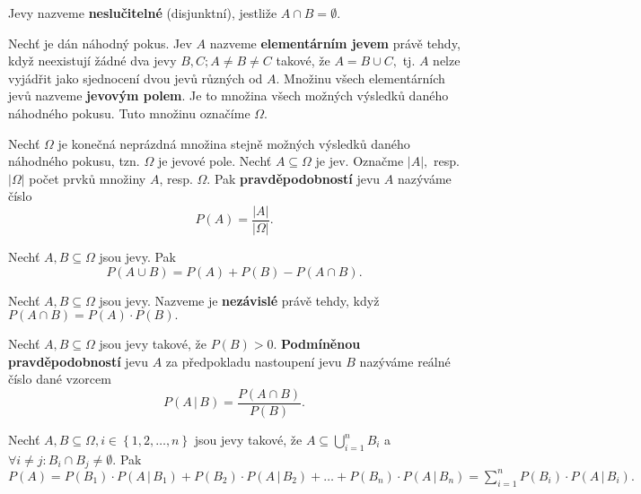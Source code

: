 \begin{definition}
    Jevy nazveme \textbf{neslučitelné} (disjunktní), jestliže $A\cap B = \emptyset.$
\end{definition}

\begin{definition}
    Nechť je dán náhodný pokus. Jev $A$ nazveme \textbf{elementárním jevem} právě tehdy,
    když neexistují žádné dva jevy $B,C; A\ne B\ne C$ takové, že $A=B\cup C,$ tj.
    $A$ nelze vyjádřit jako sjednocení dvou jevů různých od $A.$ Množinu všech
    elementárních jevů nazveme \textbf{jevovým polem}. Je to množina všech možných
    výsledků daného náhodného pokusu. Tuto množinu označíme $\Omega.$
\end{definition}

\begin{definition}
    Nechť $\Omega$ je konečná neprázdná množina stejně možných výsledků daného
    náhodného pokusu, tzn. $\Omega$ je jevové pole. Nechť $A\subseteq \Omega$ je jev.
    Označme $|A|,$ resp. $|\Omega|$ počet prvků množiny $A$, resp. $\Omega.$ Pak
    \textbf{pravděpodobností} jevu $A$ nazýváme číslo
    $$P(A)=\frac{|A|}{|\Omega|}.$$
\end{definition}

\begin{veta}
    Nechť $A,B\subseteq \Omega$ jsou jevy. Pak
    $$P(A\cup B)=P(A)+P(B)-P(A\cap B).$$
\end{veta}

\begin{definition}
    Nechť $A,B\subseteq \Omega$ jsou jevy. Nazveme je \textbf{nezávislé} právě tehdy,
    když $P(A\cap B)=P(A)\cdot P(B).$
\end{definition}

\begin{definition}
    Nechť $A,B\subseteq \Omega$ jsou jevy takové, že $P(B)>0.$ \textbf{Podmíněnou
    pravděpodobností} jevu $A$ za předpokladu nastoupení jevu $B$ nazýváme reálné
    číslo dané vzorcem
    $$P(A\, | \, B) = \frac{P(A\cap B)}{P(B)}.$$
\end{definition}

\begin{veta}
    Nechť $A,B \subseteq \Omega, i \in \left \{ 1, 2, \dots, n \right \} $ jsou jevy
    takové, že $A\subseteq \bigcup_{i=1}^n B_i$ a $\forall i\ne j: B_i\cap B_j\ne
    \emptyset.$ Pak $P(A)=P(B_1)\cdot P(A\, |\, B_1) + P(B_2)\cdot P(A \, |\, B_2)+
    \dots + P(B_n)\cdot P(A \,|\, B_n)=\sum_{i=1}^n P(B_i)\cdot P(A\, |\, B_i).$
\end{veta}

